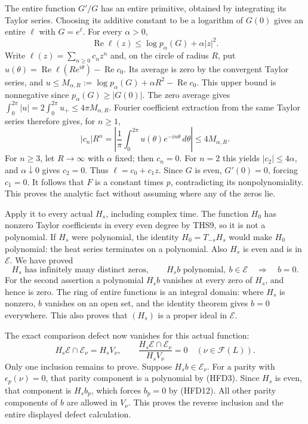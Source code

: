 The entire function $G'/G$ has an entire primitive,
obtained by integrating its Taylor series.
Choosing its additive constant to be a logarithm
of $G(0)$ gives an entire $\ell$ with $G=e^\ell$.
For every $\alpha>0$,
\[
 \operatorname{Re}\ell(z)
   \le \log p_\alpha(G)+\alpha|z|^2 .
 \tag{HFD10}
\]
Write $\ell(z)=\sum_{n\ge0}c_nz^n$ and, on the circle
of radius $R$, put
$u(\theta)=\operatorname{Re}\ell(Re^{i\theta})
                         -\operatorname{Re}c_0$.
Its average is zero by the convergent Taylor
series, and
$u\le M_{\alpha,R}:=
\log p_\alpha(G)+\alpha R^2-\operatorname{Re}c_0$.
This upper bound is nonnegative since
$p_\alpha(G)\ge|G(0)|$.
The zero average gives
$\int_0^{2\pi}|u|=2\int_0^{2\pi}u_+
                         \le4\pi M_{\alpha,R}$.
Fourier coefficient extraction from the same
Taylor series therefore gives, for $n\ge1$,
\[
 |c_n|R^n
 =\left|\frac1\pi\int_0^{2\pi}
                  u(\theta)e^{-in\theta}\,d\theta\right|
 \le4M_{\alpha,R}.
 \tag{HFD11}
\]
For $n\ge3$, let $R\to\infty$ with $\alpha$
fixed; then $c_n=0$. For $n=2$ this yields
$|c_2|\le4\alpha$, and $\alpha\downarrow0$
gives $c_2=0$. Thus $\ell=c_0+c_1z$.
Since $G$ is even, $G'(0)=0$, forcing $c_1=0$.
It follows that $F$ is a constant times $p$,
contradicting its nonpolynomiality.
This proves the analytic fact without assuming
where any of the zeros lie.

Apply it to every actual $H_s$, including complex
time. The function $H_0$ has nonzero Taylor
coefficients in every even degree by THS9,
so it is not a polynomial.
If $H_s$ were polynomial, the identity
$H_0=T_{-s}H_s$ would make $H_0$ polynomial:
the heat series terminates on a polynomial.
Also $H_s$ is even and is in $\mathcal E$.
We have proved
\begin{equation}\tag{HFD12}
 H_s\text{ has infinitely many distinct zeros},\qquad
 H_sb\text{ polynomial},\ b\in\mathcal E
      \quad\Longrightarrow\quad b=0 .
\end{equation}
For the second assertion a polynomial $H_sb$
vanishes at every zero of $H_s$, and hence is zero.
The ring of entire functions is an integral
domain: where $H_s$ is nonzero, $b$ vanishes
on an open set, and the identity theorem gives
$b=0$ everywhere. This also proves that $(H_s)$
is a proper ideal in $\mathcal E$.

The exact comparison defect now vanishes for this
actual function:
\begin{equation}\tag{HFD13}
 H_s\mathcal E\cap\mathcal E_\nu=H_sV_\nu,\qquad
 \frac{H_s\mathcal E\cap\mathcal E_\nu}{H_sV_\nu}=0
                     \quad(\nu\in\mathcal F(L)).
\end{equation}
Only one inclusion remains to prove.
Suppose $H_sb\in\mathcal E_\nu$.
For a parity with $\epsilon_p(\nu)=0$,
that parity component is a polynomial by
(HFD3). Since $H_s$ is even, that component
is $H_sb_p$, which forces $b_p=0$ by
(HFD12). All other parity components of $b$
are allowed in $V_\nu$.
This proves the reverse inclusion and the
entire displayed defect calculation.

